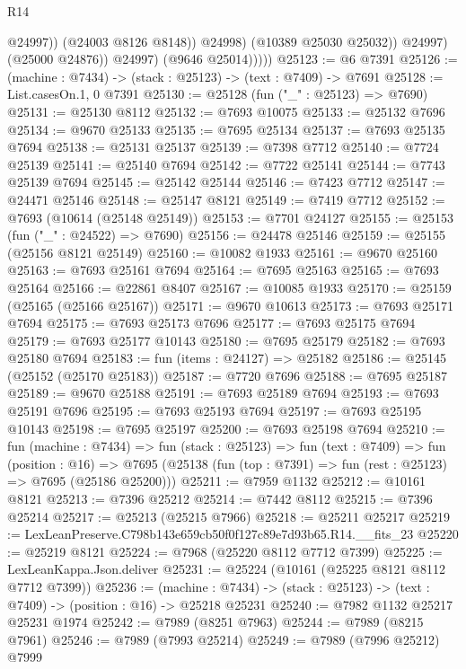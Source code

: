 \begin{lexlean}{R14}
\begin{coremodule}
                            @24997))
                        (@24003 @8126 @8148))
                      @24998)
                    (@10389 @25030 @25032))
                  @24997)
                (@25000 @24876))
              @24997)
            (@9646 @25014)))))
@25123 := @6 @7391
@25126 := (machine : @7434) -> (stack : @25123) -> (text : @7409) -> @7691
@25128 := List.casesOn.{1, 0} @7391
@25130 := @25128 (fun ("_" : @25123) => @7690)
@25131 := @25130 @8112
@25132 := @7693 @10075
@25133 := @25132 @7696
@25134 := @9670 @25133
@25135 := @7695 @25134
@25137 := @7693 @25135 @7694
@25138 := @25131 @25137
@25139 := @7398 @7712
@25140 := @7724 @25139
@25141 := @25140 @7694
@25142 := @7722 @25141
@25144 := @7743 @25139 @7694
@25145 := @25142 @25144
@25146 := @7423 @7712
@25147 := @24471 @25146
@25148 := @25147 @8121
@25149 := @7419 @7712
@25152 := @7693 (@10614 (@25148 @25149))
@25153 := @7701 @24127
@25155 := @25153 (fun ("_" : @24522) => @7690)
@25156 := @24478 @25146
@25159 := @25155 (@25156 @8121 @25149)
@25160 := @10082 @1933
@25161 := @9670 @25160
@25163 := @7693 @25161 @7694
@25164 := @7695 @25163
@25165 := @7693 @25164
@25166 := @22861 @8407
@25167 := @10085 @1933
@25170 := @25159 (@25165 (@25166 @25167))
@25171 := @9670 @10613
@25173 := @7693 @25171 @7694
@25175 := @7693 @25173 @7696
@25177 := @7693 @25175 @7694
@25179 := @7693 @25177 @10143
@25180 := @7695 @25179
@25182 := @7693 @25180 @7694
@25183 := fun (items : @24127) => @25182
@25186 := @25145 (@25152 (@25170 @25183))
@25187 := @7720 @7696
@25188 := @7695 @25187
@25189 := @9670 @25188
@25191 := @7693 @25189 @7694
@25193 := @7693 @25191 @7696
@25195 := @7693 @25193 @7694
@25197 := @7693 @25195 @10143
@25198 := @7695 @25197
@25200 := @7693 @25198 @7694
@25210 := fun (machine : @7434) =>
  fun (stack : @25123) =>
  fun (text : @7409) =>
  fun (position : @16) =>
  @7695 (@25138 (fun (top : @7391) => fun (rest : @25123) => @7695 (@25186 @25200)))
@25211 := @7959 @1132
@25212 := @10161 @8121
@25213 := @7396 @25212
@25214 := @7442 @8112
@25215 := @7396 @25214
@25217 := @25213 (@25215 @7966)
@25218 := @25211 @25217
@25219 := LexLeanPreserve.C798b143e659cb50f0f127c89e7d93b65.R14.__fits_23
@25220 := @25219 @8121
@25224 := @7968 (@25220 @8112 @7712 @7399)
@25225 := LexLeanKappa.Json.deliver
@25231 := @25224 (@10161 (@25225 @8121 @8112 @7712 @7399))
@25236 := (machine : @7434) ->
  (stack : @25123) -> (text : @7409) -> (position : @16) -> @25218 @25231
@25240 := @7982 @1132 @25217 @25231 @1974
@25242 := @7989 (@8251 @7963)
@25244 := @7989 (@8215 @7961)
@25246 := @7989 (@7993 @25214)
@25249 := @7989 (@7996 @25212) @7999

\end{coremodule}
\end{lexlean}

